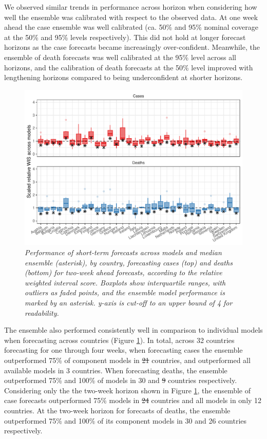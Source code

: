 \documentclass[
]{article}
\providecommand{\DIFaddtex}[1]{{\protect\color{blue}\uwave{#1}}} %
\providecommand{\DIFdeltex}[1]{{\protect\color{red}\sout{#1}}}                      %
\providecommand{\DIFaddbegin}{} %
\providecommand{\DIFaddend}{} %
\providecommand{\DIFdelbegin}{} %
\providecommand{\DIFdelend}{} %
\providecommand{\DIFadd}[1]{\texorpdfstring{\DIFaddtex{#1}}{#1}} %
\providecommand{\DIFdel}[1]{\texorpdfstring{\DIFdeltex{#1}}{}} %
\newcommand{\DIFscaledelfig}{0.5}
\newlength{\DIFdelgraphicswidth} %
\newlength{\DIFdelgraphicsheight} %
\newcommand{\DIFaddincludegraphics}[2][]{{\color{blue}\fbox{\DIFOincludegraphics[#1]{#2}}}} %
\newcommand{\DIFdelincludegraphics}[2][]{%
\sbox{\DIFdelgraphicsbox}{\DIFOincludegraphics[#1]{#2}}%
\settoboxwidth{\DIFdelgraphicswidth}{\DIFdelgraphicsbox} %
\settoboxtotalheight{\DIFdelgraphicsheight}{\DIFdelgraphicsbox} %
\scalebox{\DIFscaledelfig}{%
\parbox[b]{\DIFdelgraphicswidth}{\usebox{\DIFdelgraphicsbox}\\[-\baselineskip] \rule{\DIFdelgraphicswidth}{0em}}\llap{\resizebox{\DIFdelgraphicswidth}{\DIFdelgraphicsheight}{%
\setlength{\unitlength}{\DIFdelgraphicswidth}%
\begin{picture}(1,1)%
\thicklines\linethickness{2pt} %
{\color[rgb]{1,0,0}\put(0,0){\framebox(1,1){}}}%
{\color[rgb]{1,0,0}\put(0,0){\line( 1,1){1}}}%
{\color[rgb]{1,0,0}\put(0,1){\line(1,-1){1}}}%
\end{picture}%
}\hspace*{3pt}}} %
} %
\DeclareRobustCommand{\DIFaddbegin}{\DIFOaddbegin \let\includegraphics\DIFaddincludegraphics} %
\DeclareRobustCommand{\DIFaddend}{\DIFOaddend \let\includegraphics\DIFOincludegraphics} %
\DeclareRobustCommand{\DIFdelbegin}{\DIFOdelbegin \let\includegraphics\DIFdelincludegraphics} %
\DeclareRobustCommand{\DIFdelend}{\DIFOaddend \let\includegraphics\DIFOincludegraphics} %
\begin{document}
We observed similar trends in performance across horizon when considering how well the ensemble was calibrated with respect to the observed data. At one week ahead the case ensemble was well calibrated (ca. 50\% and 95\% nominal coverage at the 50\% and 95\% levels respectively). This did not hold at longer forecast horizons as the case forecasts became increasingly over-confident. Meanwhile, the ensemble of death forecasts was well calibrated at the 95\% level across all horizons, and the calibration of death forecasts at the 50\% level improved with lengthening horizons compared to being underconfident at shorter horizons.

\begin{figure}
\centering
\includegraphics{latest_files/figure-latex/performance-countries-1.pdf}
\caption{\label{fig:performance-countries}\emph{Performance of short-term forecasts across models and
median ensemble (asterisk), by country, forecasting cases (top) and deaths (bottom) for two-week ahead forecasts, according to the relative weighted interval score. Boxplots show interquartile ranges, with outliers as faded points, and the ensemble model performance is marked by an asterisk. y-axis is cut-off to an upper bound of 4 for readability.}}
\end{figure}

The ensemble also performed consistently well in comparison to individual models when forecasting across countries (Figure \ref{fig:performance-countries}). In total, across 32 countries forecasting for one through four weeks, when forecasting cases the ensemble outperformed 75\% of component models in \DIFdelbegin \DIFdel{21 }\DIFdelend \DIFaddbegin \DIFadd{22 }\DIFaddend countries, and outperformed all available models in 3 countries. When forecasting deaths, the ensemble outperformed 75\% and 100\% of models in 30 and \DIFdelbegin \DIFdel{9 }\DIFdelend \DIFaddbegin \DIFadd{8 }\DIFaddend countries respectively. Considering only the the two-week horizon shown in Figure \ref{fig:performance-countries}, the ensemble of case forecasts outperformed 75\% models in \DIFdelbegin \DIFdel{24 }\DIFdelend \DIFaddbegin \DIFadd{25 }\DIFaddend countries and all models in only 12 countries. At the two-week horizon for forecasts of deaths, the ensemble outperformed 75\% and 100\% of its component models in 30 and 26 countries respectively.
\end{document}
